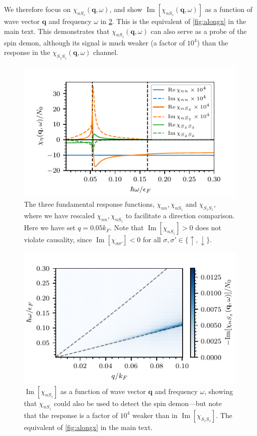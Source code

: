 \documentclass[aps,prb,reprint,twocolumns,superscriptaddress,nofootinbib]{revtex4-2}
\DeclareMathOperator{\Imm}{Im}
\newcommand{\kF}{k_{F}}
\begin{document}
	We therefore focus on $\chi_{nS_z}(\bm q,\omega)$, and show $\Imm[\chi_{nS_z}(\bm q,\omega)]$ as a function of wave vector $\bm q$ and frequency $\omega$ in \cref{fig:chi-nSz}. This is the equivalent of \cref{fig:alongx} in the main text. This demonstrates that $\chi_{nS_z}(\bm q,\omega) $ can also serve as a probe of the spin demon, although its signal is much weaker (a factor of $10^4$) than the response in the $\chi_{S_zS_z}(\bm q,\omega)$ channel.
	\begin{figure}
		\includegraphics{linecut-chi_nn}
		\caption{The three fundamental response functions, $\chi_{nn}, \chi_{nS_z}$ and $\chi_{S_zS_z}$, where we have rescaled $\chi_{nn}, \chi_{nS_z}$ to facilitate a direction comparison. Here we have set $q=0.05\kF$. Note that $\Imm[\chi_{nS_z}]>0$ does not violate causality, since $\Imm[\chi_{\sigma\sigma'}]<0$ for all $\sigma,\sigma'\in\lbrace\uparrow,\downarrow\rbrace$. \label{fig:all-chis} }
	\end{figure}
	
	\begin{figure}
		\includegraphics{nSz_3D}
		\caption{$\Imm[\chi_{nS_z}]$ as a function of wave vector $\bm q$ and frequency $\omega$, showing that $\chi_{nS_z}$ could also be used to detect the spin demon---but note that the response is a factor of $10^4$ weaker than in $\Imm[\chi_{S_zS_z}]$. The equivalent of \cref{fig:alongx} in the main text. \label{fig:chi-nSz}}
	\end{figure}
	
\end{document}
